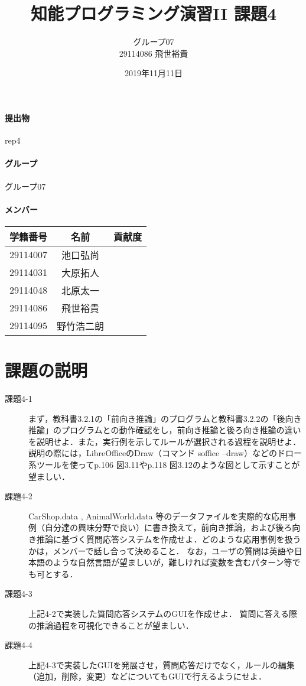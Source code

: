 \documentclass[a4j]{jarticle}
\title{知能プログラミング演習II 課題4}
\author{グループ07\\
  29114086 飛世裕貴\\
}
\date{2019年11月11日}
\begin{document}
\maketitle

\paragraph{提出物} rep4
\paragraph{グループ} グループ07
\paragraph{メンバー}
\begin{tabular}{|c|c|c|}
  \hline\hline
  学籍番号&名前&貢献度\\
  \hline\hline
  29114007&池口弘尚&\\
  \hline
  29114031&大原拓人&\\
  \hline
  29114048&北原太一&\\
  \hline
  29114086&飛世裕貴&\\
  \hline
  29114095&野竹浩二朗&\\
  \hline
\end{tabular}



\section{課題の説明}
\begin{description}
\item[課題4-1] まず，教科書3.2.1の「前向き推論」のプログラムと教科書3.2.2の「後向き推論」のプログラムとの動作確認をし，前向き推論と後ろ向き推論の違いを説明せよ．また，実行例を示してルールが選択される過程を説明せよ．説明の際には，LibreOfficeのDraw（コマンド soffice --draw）などのドロー系ツールを使ってp.106 図3.11やp.118 図3.12のような図として示すことが望ましい．

\item[課題4-2] CarShop.data , AnimalWorld.data 等のデータファイルを実際的な応用事例（自分達の興味分野で良い）に書き換えて，前向き推論，および後ろ向き推論に基づく質問応答システムを作成せよ．どのような応用事例を扱うかは，メンバーで話し合って決めること．
なお，ユーザの質問は英語や日本語のような自然言語が望ましいが，難しければ変数を含むパターン等でも可とする．

\item[課題4-3] 上記4-2で実装した質問応答システムのGUIを作成せよ．
質問に答える際の推論過程を可視化できることが望ましい．

\item[課題4-4]上記4-3で実装したGUIを発展させ，質問応答だけでなく，ルールの編集（追加，削除，変更）などについてもGUIで行えるようにせよ．

\end{description}
\end{document}
